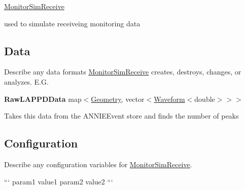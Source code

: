 \hyperlink{classMonitorSimReceive}{Monitor\-Sim\-Receive}

used to simulate receiveing monitoring data

\subsection*{Data}

Describe any data formats \hyperlink{classMonitorSimReceive}{Monitor\-Sim\-Receive} creates, destroys, changes, or analyzes. E.\-G.

{\bfseries Raw\-L\-A\-P\-P\-D\-Data} {\ttfamily map$<$\hyperlink{classGeometry}{Geometry}, vector$<$\hyperlink{classWaveform}{Waveform}$<$double$>$$>$$>$}
\begin{DoxyItemize}
\item Takes this data from the {\ttfamily A\-N\-N\-I\-E\-Event} store and finds the number of peaks
\end{DoxyItemize}

\subsection*{Configuration}

Describe any configuration variables for \hyperlink{classMonitorSimReceive}{Monitor\-Sim\-Receive}.

``` param1 value1 param2 value2 ``` 